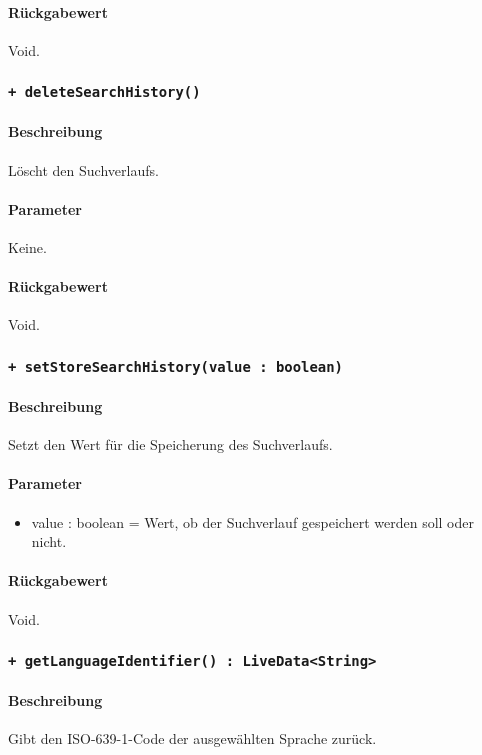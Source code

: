 \paragraph*{Rückgabewert}
Void.

\subsubsection*{\texttt{+ deleteSearchHistory()}}%
\paragraph*{Beschreibung}
Löscht den Suchverlaufs.
\paragraph*{Parameter}
Keine.
\paragraph*{Rückgabewert}
Void.

\subsubsection*{\texttt{+ setStoreSearchHistory(value : boolean)}}%
\paragraph*{Beschreibung}
Setzt den Wert für die Speicherung des Suchverlaufs.
\paragraph*{Parameter}
\begin{itemize}
    \item value : boolean = Wert, ob der Suchverlauf gespeichert werden soll oder nicht.
\end{itemize}
\paragraph*{Rückgabewert}
Void.

\subsubsection*{\texttt{+ getLanguageIdentifier() : LiveData<String>}}%
\paragraph*{Beschreibung}
Gibt den ISO-639-1-Code der ausgewählten Sprache zurück.
